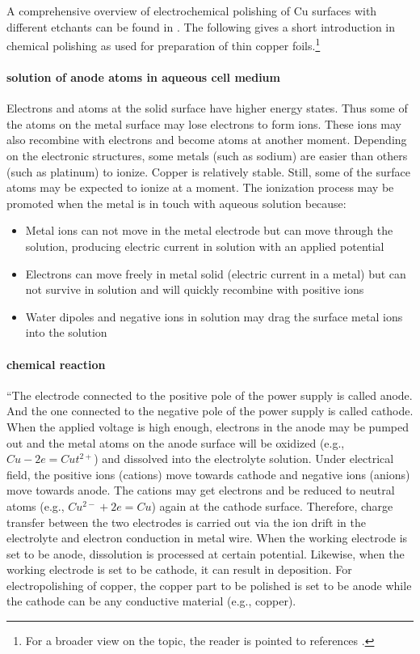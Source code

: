 A comprehensive overview of  electrochemical polishing of Cu surfaces with different etchants can be found in \cite{jinshan_electrochemical_2004}. The following gives a short introduction in chemical polishing as used for preparation of thin copper foils.\footnote{For a broader view on the topic, the reader is pointed to references \cite{antoine_polishing_1999, lilje_improved_2004, schulz_engeneering_2018}.}

\paragraph{solution of anode atoms in aqueous cell medium}
Electrons and atoms at the solid surface have higher energy states. Thus some of the atoms on the metal surface may lose electrons to form ions. These ions may also recombine with electrons and become atoms at another moment. Depending on the electronic structures, some metals (such as sodium) are easier than others (such as platinum) to ionize. Copper is relatively stable. Still, some of the surface atoms may be expected to ionize at a moment. The ionization process may be promoted when the metal is in touch with aqueous solution because: 
\begin{itemize}
	\item Metal ions can not move in the metal electrode but can move through the solution, producing electric current in solution with an applied potential
	\item Electrons can move freely in metal solid (electric current in a metal) but can not survive in solution and will quickly recombine with positive ions
	\item Water dipoles and negative ions in solution may drag the surface metal ions into the solution
\end{itemize}

\paragraph{chemical reaction}
``The electrode connected to the positive pole of the power supply is called anode. And the one connected to the negative pole of the power supply is called cathode. When the applied voltage is high enough, electrons in the anode may be pumped out and the metal atoms on the anode surface will be oxidized (e.g., $Cu - 2e = Cut^{2+}$) and dissolved into the electrolyte solution. Under electrical field, the positive ions (cations) move towards cathode and negative ions (anions) move towards anode. The cations may get electrons and be reduced to neutral atoms (e.g., $Cu^{2-} + 2e = Cu$) again at the cathode surface. Therefore, charge transfer between the two electrodes is carried out via the ion drift in the electrolyte and electron conduction in metal wire. When the working electrode is set to be anode, dissolution is processed at certain potential. Likewise, when the working electrode is set to be cathode, it can result in deposition. For electropolishing of copper, the copper part to be polished is set to be anode while the cathode can be any conductive material (e.g., copper).

